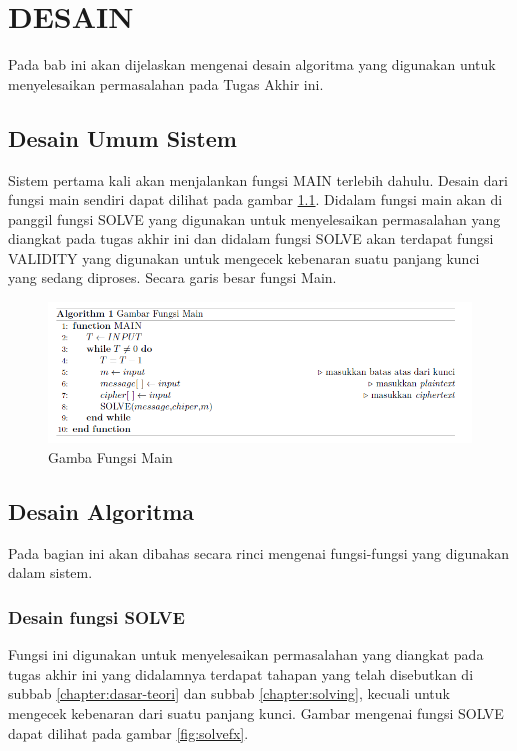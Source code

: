\chapter{DESAIN}
\label{chapter:design}
Pada bab ini akan dijelaskan mengenai desain algoritma yang digunakan untuk menyelesaikan permasalahan pada Tugas Akhir ini.
\section{Desain Umum Sistem}	
Sistem pertama kali akan menjalankan fungsi MAIN terlebih dahulu. Desain dari fungsi main sendiri dapat dilihat pada gambar \ref{fig:mainfx}. Didalam fungsi main akan di panggil fungsi SOLVE yang digunakan untuk menyelesaikan permasalahan yang diangkat pada tugas akhir ini dan didalam fungsi SOLVE akan terdapat fungsi VALIDITY yang digunakan untuk mengecek kebenaran suatu panjang kunci yang sedang diproses. Secara garis besar fungsi Main.


\begin{figure}[H]
		\centering
		\includegraphics[scale=0.5]{images/bab3/mainfx.png}
		\caption{Gamba Fungsi Main}
		\label{fig:mainfx}
	\end{figure}

\section{Desain Algoritma}
 Pada bagian ini akan dibahas secara rinci mengenai fungsi-fungsi yang digunakan dalam sistem.  
  \subsection{Desain fungsi SOLVE}
  \label{chapter:fxsolve}
  Fungsi ini digunakan untuk menyelesaikan permasalahan yang diangkat pada tugas akhir ini yang didalamnya terdapat tahapan yang telah disebutkan di subbab \ref{chapter:dasar-teori} dan subbab \ref{chapter:solving}, kecuali untuk mengecek kebenaran dari suatu panjang kunci. Gambar mengenai fungsi SOLVE dapat dilihat pada gambar \ref{fig:solvefx}.
  

